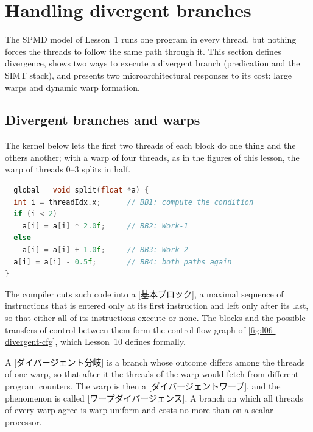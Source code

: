 \documentclass[../main.tex]{subfiles}
\begin{document}
\section{Handling divergent branches}
\label{sec:l06-divergence}

The SPMD model of Lesson~1 runs one program in every thread, but nothing
forces the threads to follow the same path through it.  This section defines
divergence, shows two ways to execute a divergent branch (predication
and the SIMT stack), and presents two microarchitectural responses to its
cost: large warps and dynamic warp formation.

\subsection{Divergent branches and warps}

The kernel below lets the first two threads of each block do one thing
and the others another; with a warp of four threads, as in the figures
of this lesson, the warp of threads 0--3 splits in half.

\begin{lstlisting}[language=C++, numbers=none]
__global__ void split(float *a) {
  int i = threadIdx.x;      // BB1: compute the condition
  if (i < 2)
    a[i] = a[i] * 2.0f;     // BB2: Work-1
  else
    a[i] = a[i] + 1.0f;     // BB3: Work-2
  a[i] = a[i] - 0.5f;       // BB4: both paths again
}
\end{lstlisting}

The compiler cuts such code into a
[基本ブロック], a maximal sequence of instructions
that is entered only at its first instruction and left only after its
last, so that either all of its instructions execute or none.  The
blocks and the possible transfers of control between them form the
control-flow graph of \cref{fig:l06-divergent-cfg}, which Lesson~10
defines formally.

\begin{definition}
  \label{def:l06-divergent}
  A [ダイバージェント分岐] is a branch whose
  outcome differs among the threads of one warp, so that after it the
  threads of the warp would fetch from different program counters.  The
  warp is then a [ダイバージェントワープ], and the
  phenomenon is called [ワープダイバージェンス].
  A branch on which all threads of every warp agree is warp-uniform and
  costs no more than on a scalar processor.
\end{definition}
\end{document}
